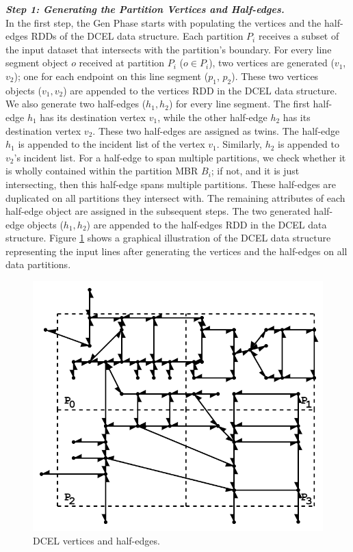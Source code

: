\vspace{4pt}
\textit{\textbf{Step 1: Generating the Partition Vertices and Half-edges.}}
\\
In the first step, the Gen Phase starts with populating the vertices and the half-edges RDDs of the DCEL data structure.
Each partition $P_i$ receives a subset of the input dataset that intersects with the partition's boundary.
For every line segment object $o$ received at partition $P_i$ ($o \in P_i$), two vertices are generated ($v_1$, $v_2$); one for each endpoint on this line segment ($p_1$, $p_2$). These two vertices objects ($v_1, v_2$) are appended to the vertices RDD in the DCEL data structure.
We also generate two half-edges ($h_1, h_2$) for every line segment. 
The first half-edge $h_1$ has its destination vertex $v_1$, while the other half-edge $h_2$ has its destination vertex $v_2$. These two half-edges are assigned as twins.
The half-edge $h_1$ is appended to the incident list of the vertex $v_1$. Similarly, $h_2$ is appended to $v_2$'s incident list.
For a half-edge to span multiple partitions, we check whether it is wholly contained within the partition MBR $B_i$; if not, and it is just intersecting, then this half-edge spans multiple partitions. 
These half-edges are duplicated on all partitions they intersect with.
The remaining attributes of each half-edge object are assigned in the subsequent steps. 
The two generated half-edge objects ($h_1, h_2$) are appended to the half-edges RDD in the DCEL data structure.
Figure \ref{fig:ddcel:step1} shows a graphical illustration of the DCEL data structure representing the input lines after generating the vertices and the 
half-edges on all data partitions.

\begin{figure}[tb]
	\centering
	\includegraphics[width=0.75 \linewidth ]{chapter2/model/ddcel-1.png}
	\caption{DCEL vertices and half-edges.}
	\label{fig:ddcel:step1}
\end{figure}


